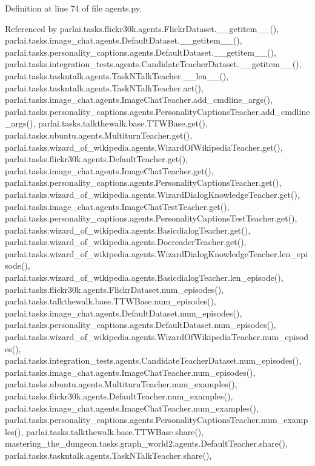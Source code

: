 Definition at line 74 of file agents.\+py.



Referenced by parlai.\+tasks.\+flickr30k.\+agents.\+Flickr\+Dataset.\+\_\+\+\_\+getitem\+\_\+\+\_\+(), parlai.\+tasks.\+image\+\_\+chat.\+agents.\+Default\+Dataset.\+\_\+\+\_\+getitem\+\_\+\+\_\+(), parlai.\+tasks.\+personality\+\_\+captions.\+agents.\+Default\+Dataset.\+\_\+\+\_\+getitem\+\_\+\+\_\+(), parlai.\+tasks.\+integration\+\_\+tests.\+agents.\+Candidate\+Teacher\+Dataset.\+\_\+\+\_\+getitem\+\_\+\+\_\+(), parlai.\+tasks.\+taskntalk.\+agents.\+Task\+N\+Talk\+Teacher.\+\_\+\+\_\+len\+\_\+\+\_\+(), parlai.\+tasks.\+taskntalk.\+agents.\+Task\+N\+Talk\+Teacher.\+act(), parlai.\+tasks.\+image\+\_\+chat.\+agents.\+Image\+Chat\+Teacher.\+add\+\_\+cmdline\+\_\+args(), parlai.\+tasks.\+personality\+\_\+captions.\+agents.\+Personality\+Captions\+Teacher.\+add\+\_\+cmdline\+\_\+args(), parlai.\+tasks.\+talkthewalk.\+base.\+T\+T\+W\+Base.\+get(), parlai.\+tasks.\+ubuntu.\+agents.\+Multiturn\+Teacher.\+get(), parlai.\+tasks.\+wizard\+\_\+of\+\_\+wikipedia.\+agents.\+Wizard\+Of\+Wikipedia\+Teacher.\+get(), parlai.\+tasks.\+flickr30k.\+agents.\+Default\+Teacher.\+get(), parlai.\+tasks.\+image\+\_\+chat.\+agents.\+Image\+Chat\+Teacher.\+get(), parlai.\+tasks.\+personality\+\_\+captions.\+agents.\+Personality\+Captions\+Teacher.\+get(), parlai.\+tasks.\+wizard\+\_\+of\+\_\+wikipedia.\+agents.\+Wizard\+Dialog\+Knowledge\+Teacher.\+get(), parlai.\+tasks.\+image\+\_\+chat.\+agents.\+Image\+Chat\+Test\+Teacher.\+get(), parlai.\+tasks.\+personality\+\_\+captions.\+agents.\+Personality\+Captions\+Test\+Teacher.\+get(), parlai.\+tasks.\+wizard\+\_\+of\+\_\+wikipedia.\+agents.\+Basicdialog\+Teacher.\+get(), parlai.\+tasks.\+wizard\+\_\+of\+\_\+wikipedia.\+agents.\+Docreader\+Teacher.\+get(), parlai.\+tasks.\+wizard\+\_\+of\+\_\+wikipedia.\+agents.\+Wizard\+Dialog\+Knowledge\+Teacher.\+len\+\_\+episode(), parlai.\+tasks.\+wizard\+\_\+of\+\_\+wikipedia.\+agents.\+Basicdialog\+Teacher.\+len\+\_\+episode(), parlai.\+tasks.\+flickr30k.\+agents.\+Flickr\+Dataset.\+num\+\_\+episodes(), parlai.\+tasks.\+talkthewalk.\+base.\+T\+T\+W\+Base.\+num\+\_\+episodes(), parlai.\+tasks.\+image\+\_\+chat.\+agents.\+Default\+Dataset.\+num\+\_\+episodes(), parlai.\+tasks.\+personality\+\_\+captions.\+agents.\+Default\+Dataset.\+num\+\_\+episodes(), parlai.\+tasks.\+wizard\+\_\+of\+\_\+wikipedia.\+agents.\+Wizard\+Of\+Wikipedia\+Teacher.\+num\+\_\+episodes(), parlai.\+tasks.\+integration\+\_\+tests.\+agents.\+Candidate\+Teacher\+Dataset.\+num\+\_\+episodes(), parlai.\+tasks.\+image\+\_\+chat.\+agents.\+Image\+Chat\+Teacher.\+num\+\_\+episodes(), parlai.\+tasks.\+ubuntu.\+agents.\+Multiturn\+Teacher.\+num\+\_\+examples(), parlai.\+tasks.\+flickr30k.\+agents.\+Default\+Teacher.\+num\+\_\+examples(), parlai.\+tasks.\+image\+\_\+chat.\+agents.\+Image\+Chat\+Teacher.\+num\+\_\+examples(), parlai.\+tasks.\+personality\+\_\+captions.\+agents.\+Personality\+Captions\+Teacher.\+num\+\_\+examples(), parlai.\+tasks.\+talkthewalk.\+base.\+T\+T\+W\+Base.\+share(), mastering\+\_\+the\+\_\+dungeon.\+tasks.\+graph\+\_\+world2.\+agents.\+Default\+Teacher.\+share(), parlai.\+tasks.\+taskntalk.\+agents.\+Task\+N\+Talk\+Teacher.\+share(), 